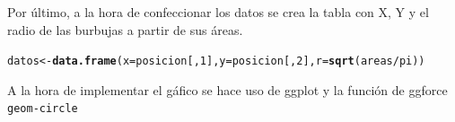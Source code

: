 \documentclass{article}\usepackage[]{graphicx}\usepackage[]{color}
\makeatletter
\newcommand{\hlnum}[1]{\textcolor[rgb]{0.686,0.059,0.569}{#1}}%
\newcommand{\hlopt}[1]{\textcolor[rgb]{0,0,0}{#1}}%
\newcommand{\hlstd}[1]{\textcolor[rgb]{0.345,0.345,0.345}{#1}}%
\newcommand{\hlkwb}[1]{\textcolor[rgb]{0.69,0.353,0.396}{#1}}%
\newcommand{\hlkwc}[1]{\textcolor[rgb]{0.333,0.667,0.333}{#1}}%
\newcommand{\hlkwd}[1]{\textcolor[rgb]{0.737,0.353,0.396}{\textbf{#1}}}%
\newenvironment{kframe}{%
 \def\at@end@of@kframe{}%
 \ifinner\ifhmode%
  \def\at@end@of@kframe{\end{minipage}}%
  \begin{minipage}{\columnwidth}%
 \fi\fi%
 \def\FrameCommand##1{\hskip\@totalleftmargin \hskip-\fboxsep
 \colorbox{shadecolor}{##1}\hskip-\fboxsep
     \hskip-\linewidth \hskip-\@totalleftmargin \hskip\columnwidth}%
 \MakeFramed {\advance\hsize-\width
   \@totalleftmargin\z@ \linewidth\hsize
   \@setminipage}}%
 {\par\unskip\endMakeFramed%
 \at@end@of@kframe}
\newenvironment{knitrout}{}{} %
\makeatother
\begin{document}
Por \'ultimo, a la hora de confeccionar los datos se crea la tabla con X, Y y el radio de las burbujas a partir de sus \'areas.
\begin{knitrout}
\color{fgcolor}\begin{kframe}
\begin{alltt}
\hlstd{datos} \hlkwb{<-} \hlkwd{data.frame}\hlstd{(}\hlkwc{x} \hlstd{= posicion[,} \hlnum{1}\hlstd{],} \hlkwc{y} \hlstd{= posicion[,} \hlnum{2}\hlstd{],} \hlkwc{r} \hlstd{=} \hlkwd{sqrt}\hlstd{(areas} \hlopt{/} \hlstd{pi))}
\end{alltt}
\end{kframe}
\end{knitrout}
A la hora de implementar el g\'afico se hace uso de ggplot y la funci\'on de ggforce \texttt{geom-circle}
\end{document}
